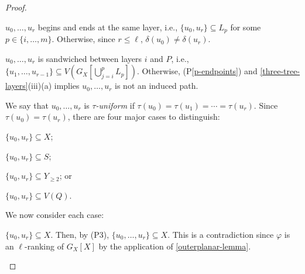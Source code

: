 \documentclass[kpfonts]{patmorin}
\theoremstyle{named}
\begin{document}
\begin{proof}
\begin{compactenum}[(P1)]
        \item $u_0,\ldots,u_r$ begins and ends at the same layer, i.e., $\{u_0,u_r\}\subseteq L_p$ for some $p\in\{i,\ldots,m\}$. Otherwise, since $r\le\ell$, $\delta(u_0)\neq\delta(u_r)$.\label{p-endpoints}

        \item $u_0,\ldots,u_r$ is sandwiched between layers $i$ and $P$, i.e., $\{u_1,\ldots,u_{r-1}\}\subseteq V(G_X[\bigcup_{j=i}^p L_p])$. Otherwise, (P\ref{p-endpoints}) and \cref{three-tree-layers}(iii)(a) implies $u_0,\ldots,u_r$ is not an induced path.\label{p-sandwhiched}



    \end{compactenum}

    We say that $u_0,\ldots,u_r$ is \emph{$\tau$-uniform} if $\tau(u_0)=\tau(u_1)=\cdots=\tau(u_r)$.  Since $\tau(u_0)=\tau(u_r)$, there are four major cases to distinguish:
    \begin{inparaenum}[(1)]
        \item $\{u_0,u_r\}\subseteq X$;
        \item $\{u_0,u_r\}\subseteq S$;
        \item $\{u_0,u_r\}\subseteq Y_{\ge 2}$; or
        \item $\{u_0,u_r\}\subseteq V(Q)$.
    \end{inparaenum}
    We now consider each case:
    \begin{compactenum}[(1)]
        \item $\{u_0,u_r\}\subseteq X$. Then, by (P3), $\{u_0,\ldots,u_r\}\subseteq X$. This is a contradiction since $\varphi$ is an $\ell$-ranking of $G_X[X]$ by the application of \cref{outerplanar-lemma}.


\end{compactenum}
\end{proof}
\end{document}
